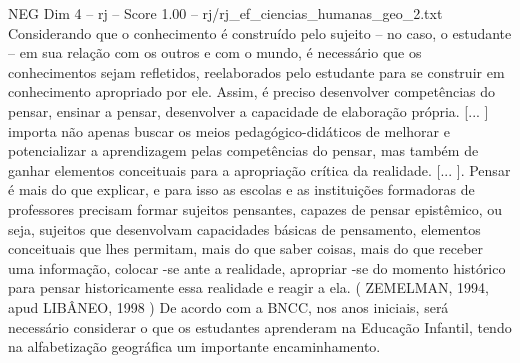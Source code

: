 \begin{textsample}{NEG Dim 4 – rj – Score 1.00 – rj/rj\_ef\_ciencias\_humanas\_geo\_2.txt}
Considerando que o conhecimento é construído pelo sujeito – no caso, o estudante – em sua relação com os outros e com o mundo, é necessário que os conhecimentos sejam refletidos, reelaborados pelo estudante para se construir em conhecimento apropriado por ele.
Assim, é preciso desenvolver competências do pensar, ensinar a pensar, desenvolver a capacidade de elaboração própria. [... ] importa não apenas buscar os meios pedagógico-didáticos de melhorar e potencializar a aprendizagem pelas competências do pensar, mas também de ganhar elementos conceituais para a apropriação crítica da realidade. [... ].
Pensar é mais do que explicar, e para isso as escolas e as instituições formadoras de professores precisam formar sujeitos pensantes, capazes de pensar epistêmico, ou seja, sujeitos que desenvolvam capacidades básicas de pensamento, elementos conceituais que lhes permitam, mais do que saber coisas, mais do que receber uma informação, colocar -se ante a realidade, apropriar -se do momento histórico para pensar historicamente essa realidade e reagir a ela. ( ZEMELMAN, 1994, apud LIBÂNEO, 1998 ) De acordo com a BNCC, nos anos iniciais, será necessário considerar o que os estudantes aprenderam na Educação Infantil, tendo na alfabetização geográfica um importante encaminhamento.

\end{textsample}
